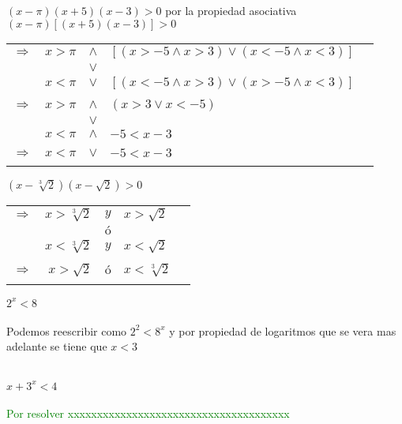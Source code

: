 \begin{ej}
$(x-\pi)(x+5)(x-3)>0$ por la propiedad asociativa $(x-\pi)\left[ (x+5)(x-3) \right]>0$
\begin{center}
\begin{tabular}{crcll}\\
$\Rightarrow$&$x>\pi$&$\land$&$\left[(x>-5\land x>3) \lor (x<-5 \land x<3) \right]$&\\
&&$\lor$&\\
&$x< \pi $&$\lor$&$\left[ (x<-5 \land x>3) \lor (x>-5 \land x<3) \right]$&\\\\
$\Rightarrow$&$x > \pi $&$\land$&$(x>3 \lor x<-5)$&\\
&&$\lor$&&\\
&$x<\pi$&$\land$&$-5<x-3$&\\\\
$\Rightarrow$&$x<\pi$&$\lor$&$-5<x-3$&\\\\
\end{tabular}
\end{center}
\end{ej}
\vspace{1cm}

\begin{ej}
$(x-\sqrt[3]{2})(x-\sqrt{2})>0$
\begin{center}
\begin{tabular}{crcll}
$\Rightarrow$&$x>\sqrt[3]{2}$&$y$&$x>\sqrt{2}$&\\
&&$ó$&&\\
&$x<\sqrt[3]{2}$&$y$&$x<\sqrt{2}$&\\\\
$\Rightarrow$&$x>\sqrt{2}$&$ó$&$x<\sqrt[3]{2}$&\\\\
\end{tabular}
\end{center}
\end{ej}

\begin{ej}
$2^x<8$\\\\
Podemos reescribir como $2^2<8^x$ y por propiedad de logaritmos que se vera mas adelante se tiene que $x<3$\\\\
\end{ej}

\begin{ej}
$x+3^x <4$\\\\
\textcolor{green}{Por resolver xxxxxxxxxxxxxxxxxxxxxxxxxxxxxxxxxxxxxx}
\end{ej}

